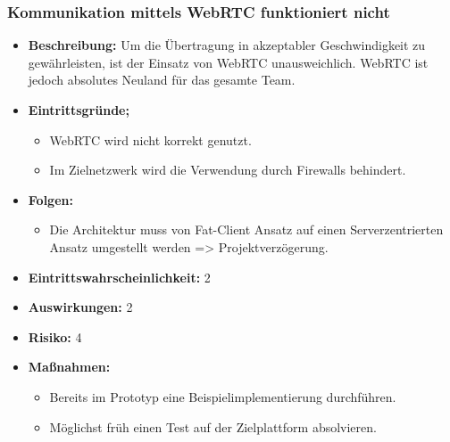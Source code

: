 \subsubsection{Kommunikation mittels WebRTC funktioniert nicht}
\begin{itemize}
	\item \textbf{Beschreibung:} \newline
	Um die Übertragung in akzeptabler Geschwindigkeit zu gewährleisten, ist der Einsatz von WebRTC unausweichlich. WebRTC ist jedoch absolutes Neuland für das gesamte Team.
	\item \textbf{Eintrittsgründe;}
	\begin{itemize}
		\item WebRTC wird nicht korrekt genutzt.
		\item Im Zielnetzwerk wird die Verwendung durch Firewalls behindert.
	\end{itemize}
	\item \textbf{Folgen:}
	\begin{itemize}
		\item Die Architektur muss von Fat-Client Ansatz auf einen Serverzentrierten Ansatz umgestellt werden => Projektverzögerung.
	\end{itemize}
	\item \textbf{Eintrittswahrscheinlichkeit:} 2
	\item \textbf{Auswirkungen:} 2
	\item \textbf{Risiko:} 4
	\item \textbf{Maßnahmen:}
	\begin{itemize}
		\item Bereits im Prototyp eine Beispielimplementierung durchführen.
		\item Möglichst früh einen Test auf der Zielplattform absolvieren.
	\end{itemize}
\end{itemize}
